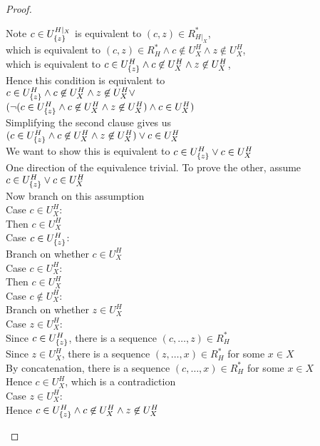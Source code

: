 \begin{proof}
\begin{tabbedproof}
\oo Note $c \in U^{H|_{X}}_{\{{z}\}}$ is equivalent to $(c,z) \in R^*_{H|_{X}}$, \\
\oo which is equivalent to  $(c, z) \in R^*_H \land c \not\in U^H_{X} \land z \not\in U^H_{X}$, \\
\oo which is equivalent to  $c \in U^H_{\{{z}\}} \land c \not\in U^H_{X} \land z \not\in U^H_{X}$, \\
\oo Hence this condition is equivalent to  \\
\oox $c \in U^H_{\{{z}\}} \land c \not\in U^H_{X} \land z \not\in U^H_{X} \vee $ \\
\oox $(\lnot(c \in U^H_{\{{z}\}} \land c \not\in U^H_{X} \land z \not\in U^H_{X}) \land c \in U^H_{X})$   \\
\oo Simplifying the second clause gives us \\
\oox $(c \in U^H_{\{{z}\}} \land c \not\in U^H_{X} \land z \not\in U^H_{X}) \vee c \in U^H_{X}$ \\
\oo We want to show this is equivalent to $c \in U^H_{\{{z}\}} \vee c \in U^H_{X}$ \\
\oo One direction of the equivalence trivial. To prove the other, assume $c \in U^H_{\{{z}\}} \vee c \in U^H_{X}$ \\
\ooo Now branch on this assumption \\
\ooo Case $c \in U^H_{X}$: \\
\oooo Then $c \in U^H_{X}$ \\
\ooo Case $c \in U^H_{\{{z}\}}$: \\ 
\oooo Branch on whether $c \in U^H_{X}$ \\
\oooo Case $c \in U^H_{X}$: \\
\ooooo Then $c \in U^H_{X}$ \\
\oooo Case $c \not\in U^H_{X}$: \\
\ooooo Branch on whether $z \in U^H_{X}$ \\
\ooooo Case $z \in U^H_{X}$: \\
\oooooo Since $c \in U^H_{\{{z}\}}$, there is a sequence $(c, \ldots, z) \in R^*_H$ \\
\oooooo Since $z \in U^H_{X}$, there is a sequence $(z, \ldots, x) \in R^*_H$ for some $x \in X$ \\
\oooooo By concatenation, there is a sequence $(c, \ldots, x) \in R^*_H$ for some  $x \in X$ \\
\oooooo Hence $c \in U^H_{X}$, which is a contradiction \\
\ooooo Case $z \in U^H_{X}$: \\
\oooooo Hence $c \in U^H_{\{{z}\}} \land c \not\in U^H_{X} \land z \not\in U^H_{X}$ \\
\end{tabbedproof}
\end{proof}


